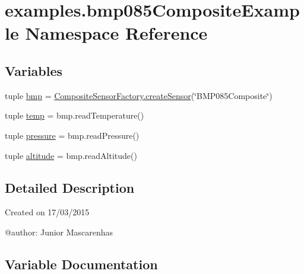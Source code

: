 \hypertarget{namespaceexamples_1_1bmp085CompositeExample}{}\section{examples.\+bmp085\+Composite\+Example Namespace Reference}
\label{namespaceexamples_1_1bmp085CompositeExample}
\subsection*{Variables}
\begin{DoxyCompactItemize}
\item 
tuple \hyperlink{namespaceexamples_1_1bmp085CompositeExample_aa0c7787fb240423d23138aa954c87a0d}{bmp} = \hyperlink{classconcretefactory_1_1compositeSensorFactory_1_1CompositeSensorFactory_a2d3860525907a2f2d37c98163150ea03}{Composite\+Sensor\+Factory.\+create\+Sensor}(\char`\"{}B\+M\+P085\+Composite\char`\"{})
\item 
tuple \hyperlink{namespaceexamples_1_1bmp085CompositeExample_aeac9716741eb5f58eebaa31e659516ad}{temp} = bmp.\+read\+Temperature()
\item 
tuple \hyperlink{namespaceexamples_1_1bmp085CompositeExample_a229ab88a16a5d1120285622bedfe4b16}{pressure} = bmp.\+read\+Pressure()
\item 
tuple \hyperlink{namespaceexamples_1_1bmp085CompositeExample_a834f047b7853b170a5ad2e7e702b6dae}{altitude} = bmp.\+read\+Altitude()
\end{DoxyCompactItemize}


\subsection{Detailed Description}
\begin{DoxyVerb}Created on 17/03/2015

@author: Junior Mascarenhas
\end{DoxyVerb}
 

\subsection{Variable Documentation}
\hypertarget{namespaceexamples_1_1bmp085CompositeExample_a834f047b7853b170a5ad2e7e702b6dae}{}
